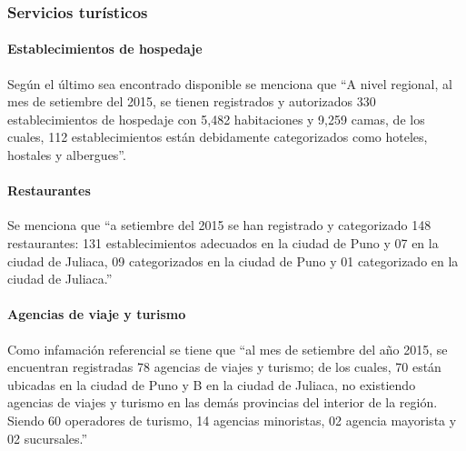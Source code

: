 \subsubsection{Servicios turísticos}
\paragraph{Establecimientos de hospedaje}
Según el último  sea encontrado disponible se menciona que “A nivel regional, al mes de setiembre del 2015, se tienen registrados y autorizados 330 establecimientos de hospedaje con 5,482 habitaciones y 9,259 camas, de los cuales, 112 establecimientos están debidamente categorizados como hoteles, hostales y albergues”. %

\paragraph{Restaurantes}
Se menciona que “a setiembre del 2015 se han registrado y categorizado 148 restaurantes: 131 establecimientos adecuados en la ciudad de Puno y 07 en la ciudad de Juliaca, 09 categorizados en la ciudad de Puno y 01 categorizado en la ciudad de Juliaca.” \cite{2015POIPuno}


\paragraph{Agencias de viaje y turismo}
Como infamación referencial se tiene que “al mes de setiembre del año 2015, se encuentran registradas 78 agencias de viajes y turismo; de los cuales, 70 están ubicadas en la ciudad de Puno y B en la ciudad de Juliaca, no existiendo agencias de viajes y turismo en las demás provincias del interior de la región. Siendo 60 operadores de turismo, 14 agencias minoristas, 02 agencia mayorista y 02 sucursales.” \cite{2015POIPuno}


